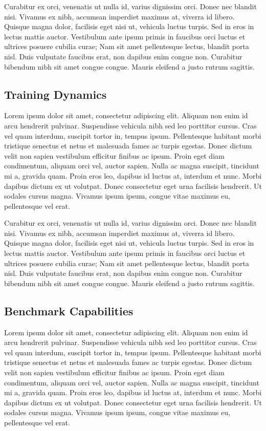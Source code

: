 \documentclass[
  openany]{book}
\begin{document}
Curabitur ex orci, venenatis ut nulla id, varius dignissim orci. Donec nec blandit nisi. Vivamus ex nibh, accumsan imperdiet maximus at, viverra id libero. Quisque magna dolor, facilisis eget nisi ut, vehicula luctus turpis. Sed in eros in lectus mattis auctor. Vestibulum ante ipsum primis in faucibus orci luctus et ultrices posuere cubilia curae; Nam sit amet pellentesque lectus, blandit porta nisl. Duis vulputate faucibus erat, non dapibus enim congue non. Curabitur bibendum nibh sit amet congue congue. Mauris eleifend a justo rutrum sagittis.

\hypertarget{training-dynamics-1}{%
\subsection{Training Dynamics}\label{training-dynamics-1}}

Lorem ipsum dolor sit amet, consectetur adipiscing elit. Aliquam non enim id arcu hendrerit pulvinar. Suspendisse vehicula nibh sed leo porttitor cursus. Cras vel quam interdum, suscipit tortor in, tempus ipsum. Pellentesque habitant morbi tristique senectus et netus et malesuada fames ac turpis egestas. Donec dictum velit non sapien vestibulum efficitur finibus ac ipsum. Proin eget diam condimentum, aliquam orci vel, auctor sapien. Nulla ac magna suscipit, tincidunt mi a, gravida quam. Proin eros leo, dapibus id luctus at, interdum et nunc. Morbi dapibus dictum ex ut volutpat. Donec consectetur eget urna facilisis hendrerit. Ut sodales cursus magna. Vivamus ipsum ipsum, congue vitae maximus eu, pellentesque vel erat.

Curabitur ex orci, venenatis ut nulla id, varius dignissim orci. Donec nec blandit nisi. Vivamus ex nibh, accumsan imperdiet maximus at, viverra id libero. Quisque magna dolor, facilisis eget nisi ut, vehicula luctus turpis. Sed in eros in lectus mattis auctor. Vestibulum ante ipsum primis in faucibus orci luctus et ultrices posuere cubilia curae; Nam sit amet pellentesque lectus, blandit porta nisl. Duis vulputate faucibus erat, non dapibus enim congue non. Curabitur bibendum nibh sit amet congue congue. Mauris eleifend a justo rutrum sagittis.

\hypertarget{benchmark-capabilities}{%
\subsection{Benchmark Capabilities}\label{benchmark-capabilities}}

Lorem ipsum dolor sit amet, consectetur adipiscing elit. Aliquam non enim id arcu hendrerit pulvinar. Suspendisse vehicula nibh sed leo porttitor cursus. Cras vel quam interdum, suscipit tortor in, tempus ipsum. Pellentesque habitant morbi tristique senectus et netus et malesuada fames ac turpis egestas. Donec dictum velit non sapien vestibulum efficitur finibus ac ipsum. Proin eget diam condimentum, aliquam orci vel, auctor sapien. Nulla ac magna suscipit, tincidunt mi a, gravida quam. Proin eros leo, dapibus id luctus at, interdum et nunc. Morbi dapibus dictum ex ut volutpat. Donec consectetur eget urna facilisis hendrerit. Ut sodales cursus magna. Vivamus ipsum ipsum, congue vitae maximus eu, pellentesque vel erat.
\end{document}
